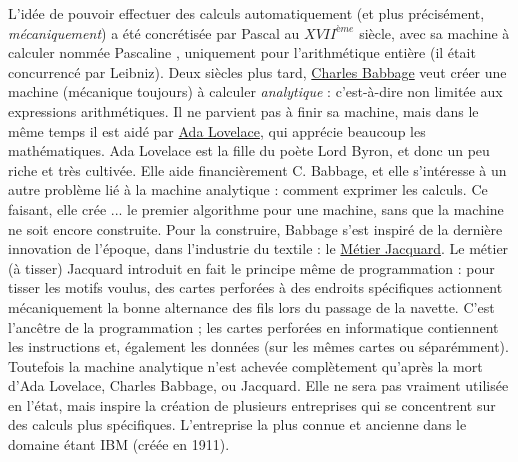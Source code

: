 \documentclass[10pt]{article}
\begin{document}
L'idée de pouvoir effectuer des calculs automatiquement (et plus précisément, \emph{mécaniquement})
a été concrétisée par Pascal au $XVII^{\mathit{ème}}$ siècle, avec sa machine à calculer nommée \og Pascaline \fg,
uniquement pour l'arithmétique entière (il était concurrencé par Leibniz).
Deux siècles plus tard, \href{https://fr.wikipedia.org/wiki/Charles_Babbage}{Charles Babbage} veut créer une machine (mécanique toujours)
à calculer \emph{analytique} : c'est-à-dire non limitée aux expressions arithmétiques. Il ne parvient pas à finir sa machine, mais dans le même temps
il est aidé par \href{https://fr.wikipedia.org/wiki/Ada_Lovelace}{Ada Lovelace}, qui apprécie beaucoup les mathématiques.
Ada Lovelace est la fille du poète Lord Byron, et donc un peu riche et très cultivée. Elle aide financièrement C. Babbage,
et elle s'intéresse à un autre problème lié à la machine analytique : comment exprimer les calculs.
Ce faisant, elle crée ... le premier algorithme pour une machine, sans que la machine ne soit encore construite.
Pour la construire, Babbage s'est inspiré de la dernière innovation de l'époque, dans l'industrie
du textile : le \href{https://fr.wikipedia.org/wiki/M\%C3\%A9tier_Jacquard}{Métier Jacquard}. Le métier (à tisser) Jacquard
introduit en fait le principe même de programmation : pour tisser les motifs voulus,
des cartes perforées à des endroits spécifiques actionnent mécaniquement
la bonne alternance des fils lors du passage de la navette. C'est l'ancêtre de la programmation ; les cartes perforées
en informatique contiennent les instructions et, également les données (sur les mêmes cartes ou séparémment).
Toutefois la machine analytique n'est achevée complètement qu'après la mort d'Ada Lovelace, Charles Babbage, ou Jacquard.
Elle ne sera pas vraiment utilisée en l'état, mais inspire la création de plusieurs entreprises qui se concentrent sur des
calculs plus spécifiques. L'entreprise la plus connue et ancienne dans le domaine étant IBM (créée en 1911).
\end{document}
